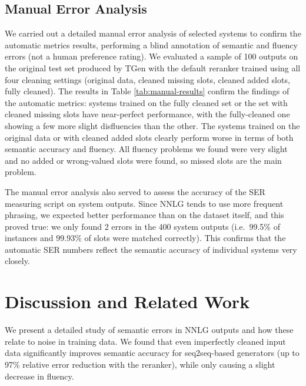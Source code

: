 \documentclass[11pt,a4paper]{article}
\begin{document}
\subsection{Manual Error Analysis}

We carried out a detailed manual error analysis of selected systems to confirm the automatic metrics results, performing a blind annotation of semantic and fluency errors (not a human preference rating).
We evaluated a sample of 100 outputs on the original test set produced by TGen with the default reranker trained using all four cleaning settings (original data, cleaned missing slots, cleaned added slots, fully cleaned).
The results in Table \ref{tab:manual-results} confirm the findings of the automatic metrics: systems trained on the fully cleaned set or the set with cleaned missing slots have near-perfect performance, with the fully-cleaned one showing a few more slight disfluencies than the other. The systems trained on the original data or with cleaned added slots clearly perform worse in terms of both semantic accuracy and fluency.
All fluency problems we found were very slight and no added or wrong-valued slots were found, so missed slots are the main problem.

The manual error analysis also served to assess the accuracy of the SER measuring script on system outputs. Since NNLG tends to use more frequent phrasing, we expected better performance than on the dataset itself, and this proved true: 
we only found 2 errors in the 400 system outputs (i.e.\ 99.5\% of instances and 99.93\% of slots were matched correctly).
This confirms that the automatic SER numbers reflect the semantic accuracy of individual systems very closely.


\section{Discussion and Related Work}

We present a detailed study
of semantic errors in NNLG outputs and how these relate to noise in training data.
We found that even imperfectly cleaned input data significantly improves semantic accuracy for seq2seq-based generators (up to 97\% relative error reduction with the reranker), while only causing a slight decrease  in fluency.
\end{document}
